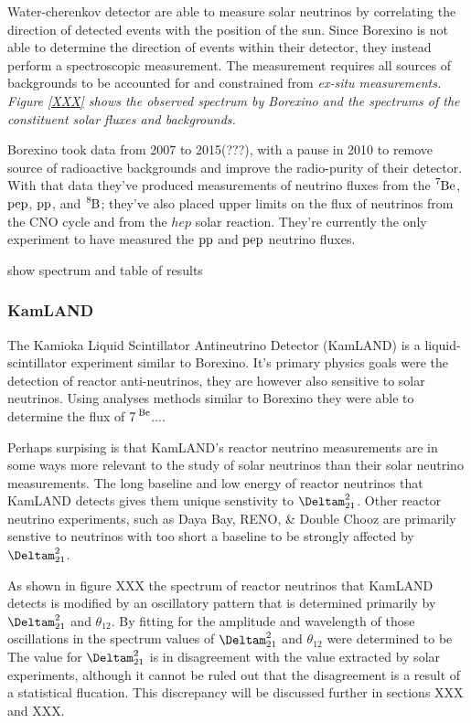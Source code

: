 Water-cherenkov detector are able to measure solar neutrinos by correlating the
direction of detected events with the position of the sun. Since Borexino is not
able to determine the direction of events within their detector, they instead
perform a spectroscopic measurement. The measurement requires
all sources of backgrounds to be accounted for and constrained from \it{ex-situ}
measurements. Figure \ref{XXX} shows the observed spectrum by Borexino and the
spectrums of the constituent solar fluxes and backgrounds.

Borexino took data from 2007 to 2015(???), with a pause in 2010 to remove source
of radioactive backgrounds and improve the radio-purity of their detector.
With that data they've produced measurements of neutrino fluxes from the $\ce{^{7}Be}$,
$\ce{pep}$, $\ce{pp}$, and $\ce{^{8}B}$; they've also placed upper limits on the flux
of neutrinos from the CNO cycle and from the $hep$ solar reaction.
They're currently the only experiment to have measured the $\ce{pp}$ and $\ce{pep}$ neutrino
fluxes.

show spectrum and table of results

\subsubsection{KamLAND}
The Kamioka Liquid Scintillator Antineutrino Detector (KamLAND) is a liquid-scintillator experiment similar to Borexino.
It's primary physics goals were the detection of reactor anti-neutrinos, they are
however also sensitive to solar neutrinos.
Using analyses methods similar to Borexino they were able to determine the flux
of $\ce{7^{Be}}$.... %

Perhaps surpising is that KamLAND's reactor neutrino measurements are in some ways
more relevant to the study of solar neutrinos than their solar neutrino measurements.
The long baseline and low energy of reactor neutrinos that KamLAND detects gives
them unique senstivity to $\Deltam^{2}_{21}$. Other reactor neutrino experiments,
such as Daya Bay, RENO, \& Double Chooz are primarily senstive to neutrinos
with too short a baseline to be strongly affected by $\Deltam^{2}_{21}$.

As shown in figure XXX %
the spectrum of reactor neutrinos that KamLAND detects is modified by an oscillatory
pattern that is determined primarily by $\Deltam^{2}_{21}$ and $\theta_{12}$.
By fitting for the amplitude and wavelength of those oscillations in the
spectrum values of $\Deltam^{2}_{21}$ and $\theta_{12}$ were determined
to be %
The value for $\Deltam^{2}_{21}$ is in disagreement with the value extracted
by solar experiments, although it cannot be ruled out that the disagreement
is a result of a statistical flucation. This discrepancy will be discussed further
in sections XXX and XXX.

